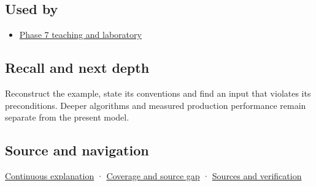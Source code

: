 \subsection{Used by}\label{appendix-292c061cd47c-used-by}

\hypertarget{appendix-292c061cd47c-used-by}{}

\begin{itemize}
\tightlist
\item
  \hyperref[01-foundations-i-ch018-keep-the-promises-visible-while-moving-between-representations]{Phase 7 teaching and laboratory}
\end{itemize}

\subsection{Recall and next depth}\label{appendix-292c061cd47c-recall-and-next-depth}

\hypertarget{appendix-292c061cd47c-recall-and-next-depth}{}

Reconstruct the example, state its conventions and find an input that violates its preconditions. Deeper algorithms and measured production performance remain separate from the present model.

\subsection{Source and navigation}\label{appendix-292c061cd47c-source-and-navigation}

\hypertarget{appendix-292c061cd47c-source-and-navigation}{}

\hyperref[01-foundations-i-ch018-keep-the-promises-visible-while-moving-between-representations]{Continuous explanation} · \hyperref[appendix-fd090d982a15-phase-7---parts-601-700]{Coverage and source gap} · \hyperref[appendix-a103e7846d21-phase-7---source-analysis-and-verification]{Sources and verification}
